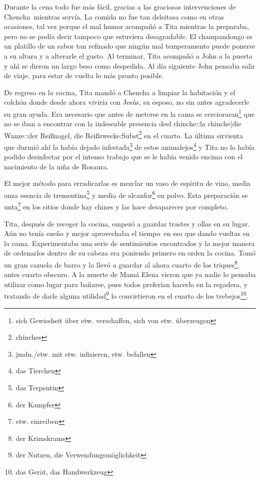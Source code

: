 Durante la cena todo fue más fácil, gracias a las graciosas
intervenciones de Chencha~mientras servía. La comida no fue tan
deleitosa como en otras ocasiones, tal vez porque el mal humor acompañó a
Tita mientras la preparaba, pero no se podía decir tampoco que estuviera
desagradable. El champandongo es un platillo de un sabor tan refinado
que ningún mal temperamento puede ponerse a su altura y a alterarle el
gusto. Al terminar, Tita acompañó a John a la puerta y ahí se dieron
un largo beso como despedida. Al día siguiente John pensaba salir de
viaje, para estar de vuelta lo más pronto posible.

De regreso en la cocina, Tita mandó a Chencha a limpiar la habitación
y el colchón donde desde ahora viviría con Jesús, su esposo, no sin
antes agradecerle su gran ayuda. Era necesario que antes de meterse en
la cama se cercioraran\footnote{sich Gewissheit über etw. verschaffen, sich von etw. überzeugen}
que no se iban a encontrar con la indeseable
presencia deel chinche::la chinche|die Wanze::der Reißnagel, die Reißzwecke:Subst\footnote{chinches} en el cuarto.
La última sirvienta que durmió ahí la
había dejado infestada\footnote{jmdn./etw. mit etw. infizieren, etw. befallen}
de estos animalejos\footnote{das Tierchen} y Tita no lo había podido
desinfectar por el intenso trabajo que se le había venido encima con el
nacimiento de la niña de Rosaura.

El mejor método para erradicarlas es mezclar un vaso de espíritu de
vino, media onza esencia de trementina\footnote{das Terpentin}
y media de alcanfor\footnote{der Kampfer} en polvo.
Esta preparación se unta\footnote{etw. einreiben} en los sitios
donde hay chines y las hace desaparecer por completo.

Tita, después de recoger la cocina, empezó a guardar trastes y ollas en
su lugar. Aún no tenía sueño y mejor aprovechaba el tiempo~en eso
que dando vueltas en la cama. Experimentaba una serie de sentimientos
encontrados y la mejor manera de ordenarlos dentro de su cabeza era
poniendo primero en orden la cocina. Tomó un gran cazuela de barro y la
llevó a guardar al ahora cuarto de los triques\footnote{der Krimskrams},
antes cuarto obscuro. A la muerte de Mamá Elena vieron que ya nadie
lo pensaba utilizar como lugar para bañarse, pues todos preferían hacerlo
en la regadera, y tratando de darle alguna utilidad\footnote{der Nutzen, die Verwendungsmöglichkeit}
lo convirtieron en el cuarto de los trebejos\footnote{das Gerät, das Handwerkzeug}.

